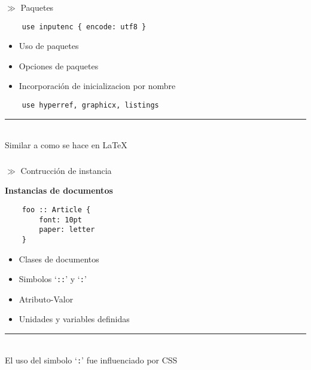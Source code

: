 \documentclass[10pt]{beamer}
\newcommand{\bi}{\begin{itemize}}
\newcommand{\ei}{\end{itemize}}
\newcommand{\subt}[1]{{\footnotesize \color{subtitle} $\gg$ {#1}}}
\newcommand{\OhTeX}{%
    \makebox[0.76em][c]{O}%
    \makebox[0.25em][c]{%
        \raisebox{0.14em}[0em][0em]{%
            \fontsize{0.5em}{0cm}%
                \selectfont H%
        }%
    }%
    \makebox[1.35em][c]{\TeX}%
}
\begin{document}
\begin{frame}[fragile]
\frametitle{\OhTeX}
\subt{Paquetes}
\begin{lstlisting}
    use inputenc { encode: utf8 }
\end{lstlisting}
\pause
\bi
    \item {\color<3->{gray} Uso de paquetes}
    \pause
    \item { Opciones de paquetes}
    \pause
    \item { Incorporación de inicializacion por nombre}
\ei
\pause
\begin{lstlisting}
    use hyperref, graphicx, listings
\end{lstlisting}
\pause
\vfill
\rule{0.5\textwidth}{0.3pt}\\
{\scriptsize \color{hilight} Similar a como se hace en \LaTeX}
\end{frame}

\begin{frame}[fragile]
\frametitle{\OhTeX}
\subt{Contrucción de instancia}
\begin{center}
{\small
\textbf{Instancias de documentos}}
\end{center}
\begin{lstlisting}
    foo :: Article {
        font: 10pt
        paper: letter
    }
\end{lstlisting}
\pause
\bi
    \item {\color<3->{gray} Clases de documentos}
    \pause
    \item { Simbolos `\texttt{::}' y `\texttt{:}'}
    \pause
    \item {\color<5->{gray} Atributo-Valor}
    \pause
    \item { Unidades y variables definidas}
\ei

\pause
\vfill
\rule{0.5\textwidth}{0.3pt}\\
{\scriptsize \color{hilight} El uso del simbolo `\texttt{:}' fue influenciado por CSS}
\end{frame}
\end{document}
